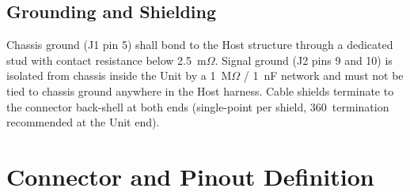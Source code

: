 \documentclass[11pt,a4paper]{scrreprt}
\begin{document}
\section{Grounding and Shielding}
Chassis ground (J1 pin 5) shall bond to the Host structure through a dedicated stud with
contact resistance below 2.5~m$\Omega$. Signal ground (J2 pins 9 and 10) is isolated from
chassis inside the Unit by a 1~M$\Omega$ / 1~nF network and must not be tied to chassis
ground anywhere in the Host harness. Cable shields terminate to the connector back-shell at
both ends (single-point per shield, 360\textdegree\ termination recommended at the Unit end).

\chapter{Connector and Pinout Definition}
\end{document}
